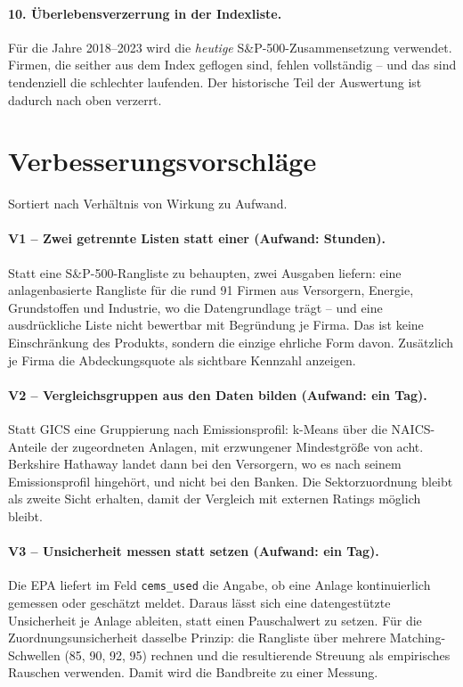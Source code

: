 \documentclass[11pt,a4paper]{article}
\begin{document}
\paragraph{10. Überlebensverzerrung in der Indexliste.}
Für die Jahre 2018--2023 wird die \emph{heutige} S\&P-500-Zusammensetzung verwendet. Firmen, die seither aus dem Index geflogen sind, fehlen vollständig -- und das sind tendenziell die schlechter laufenden. Der historische Teil der Auswertung ist dadurch nach oben verzerrt.

\section{Verbesserungsvorschläge}
\label{sec:verbesser}

Sortiert nach Verhältnis von Wirkung zu Aufwand.

\paragraph{V1 -- Zwei getrennte Listen statt einer (Aufwand: Stunden).}
Statt eine \glqq S\&P-500-Rangliste\grqq{} zu behaupten, zwei Ausgaben liefern: eine anlagenbasierte Rangliste für die rund 91 Firmen aus Versorgern, Energie, Grundstoffen und Industrie, wo die Datengrundlage trägt -- und eine ausdrückliche Liste \glqq nicht bewertbar\grqq{} mit Begründung je Firma. Das ist keine Einschränkung des Produkts, sondern die einzige ehrliche Form davon. Zusätzlich je Firma die Abdeckungsquote als sichtbare Kennzahl anzeigen.

\paragraph{V2 -- Vergleichsgruppen aus den Daten bilden (Aufwand: ein Tag).}
Statt GICS eine Gruppierung nach Emissionsprofil: k-Means über die NAICS-Anteile der zugeordneten Anlagen, mit erzwungener Mindestgröße von acht. Berkshire Hathaway landet dann bei den Versorgern, wo es nach seinem Emissionsprofil hingehört, und nicht bei den Banken. Die Sektorzuordnung bleibt als zweite Sicht erhalten, damit der Vergleich mit externen Ratings möglich bleibt.

\paragraph{V3 -- Unsicherheit messen statt setzen (Aufwand: ein Tag).}
Die EPA liefert im Feld \texttt{cems\_used} die Angabe, ob eine Anlage kontinuierlich gemessen oder geschätzt meldet. Daraus lässt sich eine datengestützte Unsicherheit je Anlage ableiten, statt einen Pauschalwert zu setzen. Für die Zuordnungsunsicherheit dasselbe Prinzip: die Rangliste über mehrere Matching-Schwellen (85, 90, 92, 95) rechnen und die resultierende Streuung als empirisches Rauschen verwenden. Damit wird die Bandbreite zu einer Messung.
\end{document}
